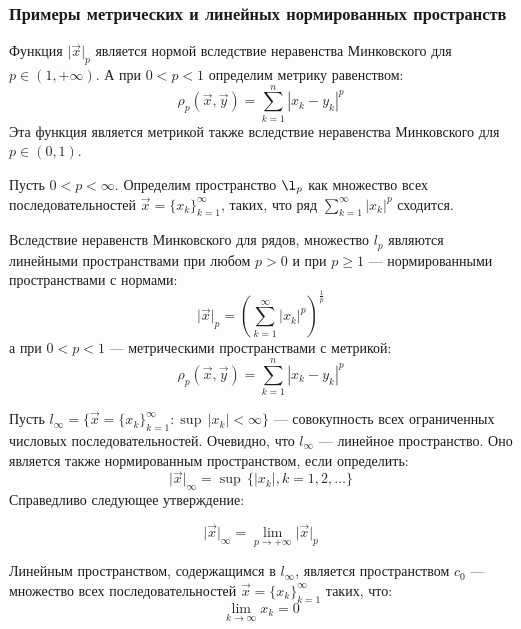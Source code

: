 \subsubsection{Примеры метрических и линейных нормированных пространств}
Функция $\vert\vec{x}\vert_p$ является нормой вследствие неравенства Минковского
для $p\in(1, +\infty)$. А при $0 < p < 1$ определим метрику равенством:
$$
\rho_{p}(\vec{x}, \vec{y}) = \sum\limits^n_{k=1} |x_k - y_k|^{p}
$$
Эта функция является метрикой также вследствие неравенства Минковского для $p \in (0, 1)$.


Пусть $0 < p < \infty$. Определим пространство $\l_{p}$ как множество всех 
последовательностей $\vec{x} = \{x_k\}^{\infty}_{k=1}$,
    таких, что ряд $\sum\limits^{\infty}_{k=1} |x_k|^{p}$ сходится.


Вследствие неравенств Минковского для рядов,
множество $l_{p}$ являются линейными пространствами при любом $p > 0$
и при  $p \geqslant 1$ --- нормированными пространствами с нормами:
$$
\vert\vec{x}\vert_{p} = \left(\sum\limits^{\infty}_{k=1} |x_k|^{p}\right)^{\frac{1}{p}}
$$
а при $ 0 < p < 1$ --- метрическими пространствами с метрикой:
$$
\rho_{p}(\vec{x}, \vec{y}) = \sum^n_{k=1} |x_k - y_k|^{p}
$$


Пусть $l_{\infty} = \{\vec{x} = \{ x_k\}^{\infty}_{k=1} : \sup\, |x_k| < \infty\}$ ---
совокупность всех ограниченных числовых последовательностей. 
Очевидно, что $l_{\infty}$ --- линейное пространство.
Оно является также нормированным пространством, если определить:
$$
\vert\vec{x}\vert_{\infty} = \sup\, \{|x_k|, k = 1, 2,\ldots\}
$$
Справедливо следующее утверждение:

\vglue 10pt

\noindent
{}

$$
\vert\vec{x}\vert_{\infty} = \lim_{p \to +\infty} \vert\vec{x}\vert_{p}
$$

Линейным пространством, содержащимся в $l_\infty$, является пространством $c_0$ ---
множество всех последовательностей $\vec{x} = \{x_k\}^\infty_{k=1}$
таких, что:
$$
\lim_{k \to \infty} x_k = 0 
$$


